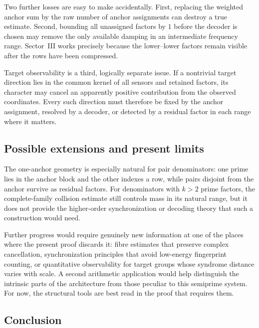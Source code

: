 Two further losses are easy to make accidentally.  First, replacing the weighted anchor sum by the raw number of anchor assignments can destroy a true estimate.  Second, bounding all unassigned factors by $1$ before the decoder is chosen may remove the only available damping in an intermediate frequency range.  Sector~III works precisely because the lower--lower factors remain visible after the rows have been compressed.

Target observability is a third, logically separate issue.  If a nontrivial target direction lies in the common kernel of all sensors and retained factors, its character may cancel an apparently positive contribution from the observed coordinates.  Every such direction must therefore be fixed by the anchor assignment, resolved by a decoder, or detected by a residual factor in each range where it matters.

\subsection{Possible extensions and present limits}

The one-anchor geometry is especially natural for pair denominators: one prime lies in the anchor block and the other indexes a row, while pairs disjoint from the anchor survive as residual factors.  For denominators with $k>2$ prime factors, the complete-family collision estimate still controls mass in its natural range, but it does not provide the higher-order synchronization or decoding theory that such a construction would need.

Further progress would require genuinely new information at one of the places where the present proof discards it: fibre estimates that preserve complex cancellation, synchronization principles that avoid low-energy fingerprint counting, or quantitative observability for target groups whose syndrome distance varies with scale.  A second arithmetic application would help distinguish the intrinsic parts of the architecture from those peculiar to this semiprime system.  For now, the structural tools are best read in the proof that requires them.

\subsection{Conclusion}


